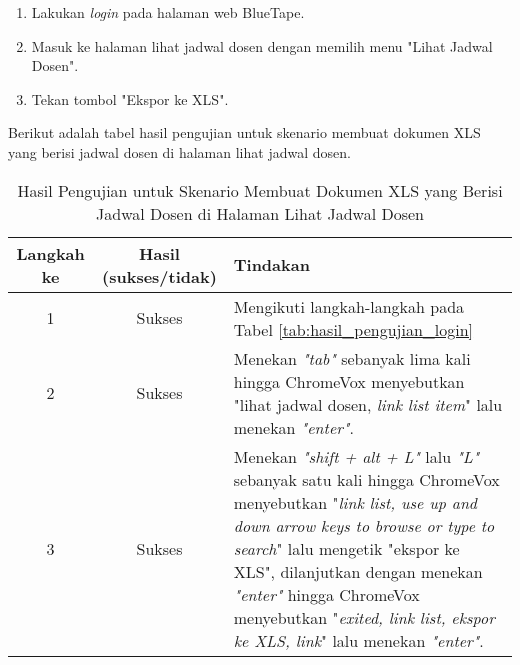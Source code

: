 \begin{enumerate}
    \item Lakukan \textit{login} pada halaman web BlueTape.
    \item Masuk ke halaman lihat jadwal dosen dengan memilih menu "Lihat Jadwal Dosen".
    \item Tekan tombol "Ekspor ke XLS".
\end{enumerate}

Berikut adalah tabel hasil pengujian untuk skenario membuat dokumen XLS yang berisi jadwal dosen di halaman lihat jadwal dosen.

\begin{table}[H]
    \centering 
    \caption{Hasil Pengujian untuk Skenario Membuat Dokumen XLS yang Berisi Jadwal Dosen di Halaman Lihat Jadwal Dosen}
    \label{tab:hasil_pengujian_membuat_dokumen_xls_yang_berisi_jadwal_dosen_di_halaman_lihat_jadwal_dosen}
    \begin{tabular}{|c|c|p{10cm}|}
        \toprule
        Langkah ke & Hasil (sukses/tidak) & Tindakan \\

        \midrule
        1 & Sukses & Mengikuti langkah-langkah pada Tabel \ref{tab:hasil_pengujian_login} \\
        2 & Sukses & Menekan \textit{"tab"} sebanyak lima kali hingga ChromeVox menyebutkan "lihat jadwal dosen, \textit{link list item}" lalu menekan \textit{"enter"}. \\
        3 & Sukses & Menekan \textit{"shift + alt + L"} lalu \textit{"L"} sebanyak satu kali hingga ChromeVox menyebutkan "\textit{link list, use up and down arrow keys to browse or type to search}" lalu mengetik "ekspor ke XLS", dilanjutkan dengan menekan \textit{"enter"} hingga ChromeVox menyebutkan "\textit{exited, link list, ekspor ke XLS, link}" lalu menekan \textit{"enter"}. \\

        \bottomrule

    \end{tabular}
\end{table}